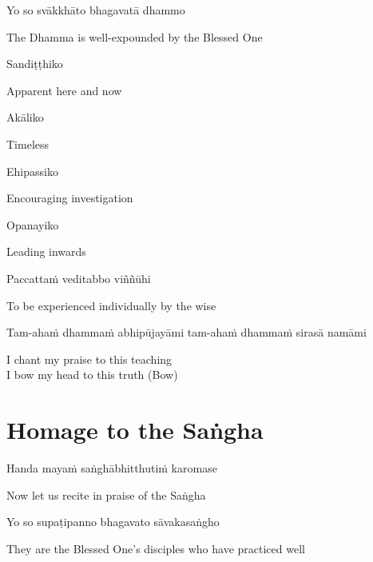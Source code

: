 Yo so svākkhāto bhagavatā dhammo

\begin{cprenglish}
  The Dhamma is well-expounded by the Blessed One
\end{cprenglish}

Sandiṭṭhiko

\begin{cprenglish}
  Apparent here and now
\end{cprenglish}

Akāliko

\begin{cprenglish}
  Timeless
\end{cprenglish}

Ehipassiko

\begin{cprenglish}
  Encouraging investigation
\end{cprenglish}

Opanayiko

\begin{cprenglish}
  Leading inwards
\end{cprenglish}

Paccattaṁ veditabbo viññūhi

\begin{cprenglish}
  To be experienced individually by the wise
\end{cprenglish}

Tam-ahaṁ dhammaṁ abhipūjayāmi tam-ahaṁ dhammaṁ sirasā namāmi

\begin{cprenglish}
  I chant my praise to this teaching\\
  I bow my head to this truth (Bow)
\end{cprenglish}

\section{Homage to the Saṅgha}

\begin{leader}
  Handa mayaṁ saṅghābhitthutiṁ karomase
\end{leader}
\begin{leader}
  Now let us recite in praise of the Saṅgha
\end{leader}

Yo so supaṭipanno bhagavato sāvakasaṅgho

\begin{cprenglish}
  They are the Blessed One’s disciples who have practiced well
\end{cprenglish}

